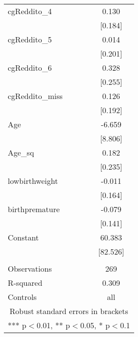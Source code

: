 \documentclass[]{article}
\begin{document}
\begin{tabular}{lc}
cgReddito\_4 & 0.130 \\
 & [0.184] \\
cgReddito\_5 & 0.014 \\
 & [0.201] \\
cgReddito\_6 & 0.328 \\
 & [0.255] \\
cgReddito\_miss & 0.126 \\
 & [0.192] \\
Age & -6.659 \\
 & [8.806] \\
Age\_sq & 0.182 \\
 & [0.235] \\
lowbirthweight & -0.011 \\
 & [0.164] \\
birthpremature & -0.079 \\
 & [0.141] \\
Constant & 60.383 \\
 & [82.526] \\
 &  \\
Observations & 269 \\
R-squared & 0.309 \\
 Controls & all \\ \hline
\multicolumn{2}{c}{ Robust standard errors in brackets} \\
\multicolumn{2}{c}{ *** p$<$0.01, ** p$<$0.05, * p$<$0.1} \\
\end{tabular}
\end{document}
